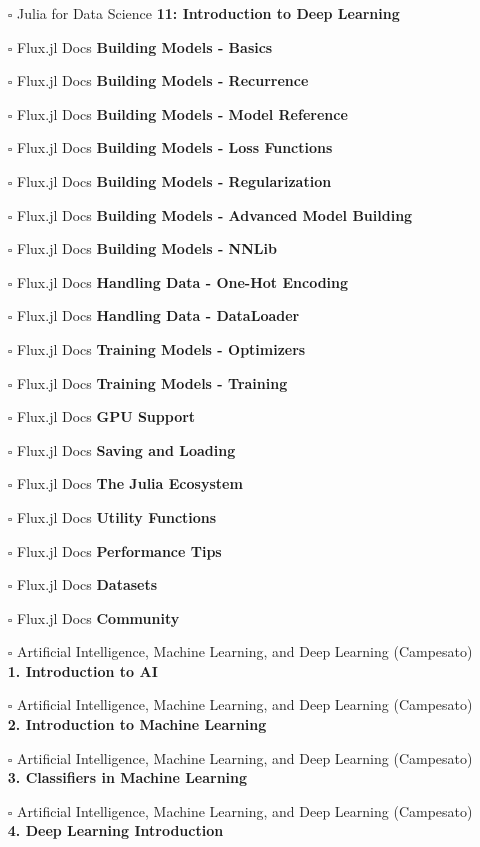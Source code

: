 \documentclass[a4, landscape, 12pt]{article}
\newcommand{\checkbox}{$\square$}%
\begin{document}
\begin{itemize}
{}
\item [\checkbox]  Julia for Data Science \textbf{ 11: Introduction to Deep Learning
}
\item [\checkbox]  Flux.jl Docs \textbf{ Building Models - Basics
}
\item [\checkbox]  Flux.jl Docs \textbf{ Building Models - Recurrence
}
\item [\checkbox]  Flux.jl Docs \textbf{ Building Models - Model Reference
}
\item [\checkbox]  Flux.jl Docs \textbf{ Building Models - Loss Functions
}
\item [\checkbox]  Flux.jl Docs \textbf{ Building Models - Regularization
}
\item [\checkbox]  Flux.jl Docs \textbf{ Building Models - Advanced Model Building
}
\item [\checkbox]  Flux.jl Docs \textbf{ Building Models - NNLib
}
\item [\checkbox]  Flux.jl Docs \textbf{ Handling Data - One-Hot Encoding
}
\item [\checkbox]  Flux.jl Docs \textbf{ Handling Data - DataLoader
}
\item [\checkbox]  Flux.jl Docs \textbf{ Training Models - Optimizers
}
\item [\checkbox]  Flux.jl Docs \textbf{ Training Models - Training
}
\item [\checkbox]  Flux.jl Docs \textbf{ GPU Support
}
\item [\checkbox]  Flux.jl Docs \textbf{ Saving and Loading
}
\item [\checkbox]  Flux.jl Docs \textbf{ The Julia Ecosystem
}
\item [\checkbox]  Flux.jl Docs \textbf{ Utility Functions
}
\item [\checkbox]  Flux.jl Docs \textbf{ Performance Tips
}
\item [\checkbox]  Flux.jl Docs \textbf{ Datasets
}
\item [\checkbox]  Flux.jl Docs \textbf{ Community
}
\item [\checkbox]  Artificial Intelligence, Machine Learning, and Deep Learning (Campesato) \textbf{ 1. Introduction to AI
}
\item [\checkbox]  Artificial Intelligence, Machine Learning, and Deep Learning (Campesato) \textbf{ 2. Introduction to Machine Learning
}
\item [\checkbox]  Artificial Intelligence, Machine Learning, and Deep Learning (Campesato) \textbf{ 3. Classifiers in Machine Learning
}
\item [\checkbox]  Artificial Intelligence, Machine Learning, and Deep Learning (Campesato) \textbf{ 4. Deep Learning Introduction
}
\end{itemize}
\end{document}
